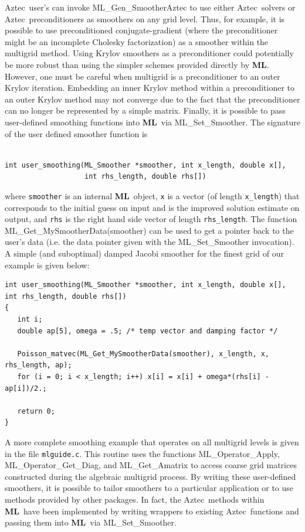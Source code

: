 \documentclass{article}[11pt]
\newcommand{\Aztec}  {{\sc Aztec}}
\newcommand{\ML}     {{\bf ML}}
\begin{document}
\Aztec~user's \cite{Aztec} can invoke {\sf ML\_Gen\_SmootherAztec} to use either
\Aztec~solvers or \Aztec~preconditioners as smoothers on any 
grid level. Thus, for example, it is possible to use preconditioned
conjugate-gradient (where the preconditioner might be an incomplete
Cholesky factorization) as a smoother within the multigrid method.
Using Krylov smoothers as a preconditioner could potentially be more
robust than using the simpler schemes provided directly by \ML.
However, one must be careful when multigrid is a preconditioner
to an outer Krylov iteration. Embedding an inner Krylov method within
a preconditioner to an outer Krylov method may not converge
due to the fact that the preconditioner can no longer be represented
by a simple matrix.
Finally, it is possible to pass user-defined smoothing functions into
\ML\ via {\sf ML\_Set\_Smoother}. The signature of the user defined
smoother function is
\begin{verbatim}

int user_smoothing(ML_Smoother *smoother, int x_length, double x[],
                   int rhs_length, double rhs[])

\end{verbatim}
where {\tt smoother} is an internal \ML\ object,
{\tt x} is a vector (of length {\tt x\_length}) that corresponds to the initial
guess on input and is the improved solution estimate on output, and {\tt rhs}
is the right hand side vector of length {\tt rhs\_length}. 
The function {\sf ML\_Get\_MySmootherData(smoother)} can be used to get
a pointer back to the user's data (i.e. the data pointer given with 
the {\sf ML\_Set\_Smoother} invocation). 
A simple (and suboptimal)
damped Jacobi smoother for the finest grid of our example is given below:
{\small 
\begin{verbatim}
int user_smoothing(ML_Smoother *smoother, int x_length, double x[], int rhs_length, double rhs[])
{
   int i;
   double ap[5], omega = .5; /* temp vector and damping factor */

   Poisson_matvec(ML_Get_MySmootherData(smoother), x_length, x, rhs_length, ap);
   for (i = 0; i < x_length; i++) x[i] = x[i] + omega*(rhs[i] - ap[i])/2.;

   return 0;
}
\end{verbatim} 
}
\noindent
A more complete smoothing example that operates on all multigrid levels
is given in the file \verb'mlguide.c'. This routine uses the functions
{\sf ML\_Operator\_Apply}, {\sf ML\_Operator\_Get\_Diag}, and {\sf
  ML\_Get\_Amatrix} to access coarse grid matrices constructed during
the algebraic multigrid process.  By writing these user-defined
smoothers, it is possible to tailor smoothers to a particular
application or to use methods provided by other packages.  In fact, the
\Aztec~methods within \ML\ have been implemented by writing wrappers to
existing \Aztec~functions and passing them into \ML\ via {\sf
  ML\_Set\_Smoother}.
\end{document}
